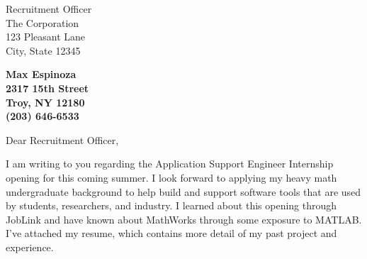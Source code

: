 \documentclass[11pt]{letter} %
\begin{document}

\begin{letter}{
Recruitment Officer \\
The Corporation \\
123 Pleasant Lane \\
City, State 12345} 


\begin{center}
\large\bf Max Espinoza \\ %
2317 15th Street \\ Troy, NY 12180 \\ (203) 646-6533 %
\end{center} 
\vfill

\signature{Max Espinoza} %


\opening{Dear Recruitment Officer,} 
 

I am writing to you regarding the Application Support Engineer Internship opening for this coming summer.
I look forward to applying my heavy math undergraduate background to help build
and support software tools that are used by students, researchers, and industry.
I learned about this opening through JobLink and have known about MathWorks 
through some exposure to MATLAB.
I've attached my resume, which contains more detail of my past project and experience. 




\end{letter}
\end{document}
